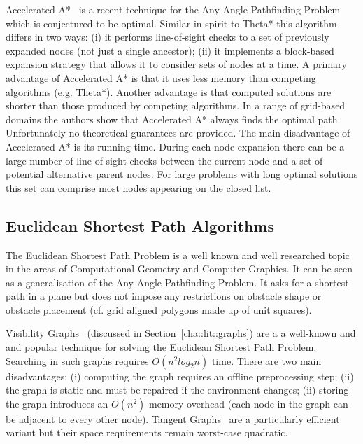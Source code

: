 Accelerated A*~\citep{sislak09a,sislak09b} is a recent technique for the Any-Angle Pathfinding
Problem which is conjectured to be optimal. Similar in spirit to Theta* this algorithm differs in
two ways: (i) it performs line-of-sight checks to a set of previously expanded nodes (not just a
single ancestor); (ii) it implements a block-based expansion strategy that allows it to consider
sets of nodes at a time.  
A primary advantage of Accelerated A* is that it uses less memory than competing algorithms (e.g.
Theta*).  Another advantage is that computed solutions are shorter than those produced by competing
algorithms. In a range of grid-based domains the authors show that Accelerated A* always finds the
optimal path.  Unfortunately no theoretical guarantees are provided.  The main disadvantage of
Accelerated A* is its running time. During each node expansion there can be a large number of
line-of-sight checks between the current node and a set of potential alternative parent nodes.  For
large problems with long optimal solutions this set can comprise most nodes appearing on the closed
list.


\subsection{Euclidean Shortest Path Algorithms}
\label{cha::lit::euclidean::euclidean}
The Euclidean Shortest Path Problem is a well known and well researched topic in the areas of
Computational Geometry and Computer Graphics. It can be seen as a generalisation of the Any-Angle 
Pathfinding Problem. It asks for a shortest path in a plane but does not impose any restrictions on
obstacle shape or obstacle placement (cf. grid aligned polygons made up of unit squares). 

Visibility Graphs~\cite{lozanoperez79} (discussed in Section~\ref{cha::lit::graphs})
are a a well-known and and popular technique for solving the Euclidean Shortest Path 
Problem. Searching in such graphs requires $O(n^2log_{2}{n})$ time.  There are two 
main disadvantages: (i) computing the graph requires an offline preprocessing step;
(ii) the graph is static and must be repaired if the environment changes;
(ii) storing the graph introduces an $O(n^2)$ memory overhead (each node in 
the graph can be adjacent to every other node). Tangent Graphs~\cite{liu92} are a 
particularly efficient variant but their space requirements remain worst-case 
quadratic. 

